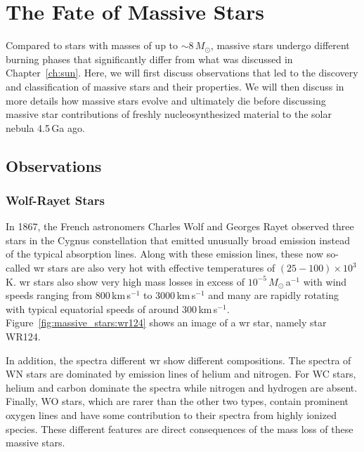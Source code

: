 
\chapter{The Fate of Massive Stars}

Compared to stars with masses of up to $\sim 8\,M_\odot$, massive stars undergo different burning phases that significantly differ from what was discussed in Chapter~\ref{ch:sun}. Here, we will first discuss observations that led to the discovery and classification of massive stars and their properties. We will then discuss in more details how massive stars evolve and ultimately die before discussing massive star contributions of freshly nucleosynthesized material to the solar nebula 4.5\,Ga ago.

\section{Observations}

\subsection{Wolf-Rayet Stars} In 1867, the French astronomers Charles Wolf and Georges Rayet observed three stars in the Cygnus constellation that emitted unusually broad emission instead of the typical absorption lines. Along with these emission lines, these now so-called \ac{wr} stars are also very hot with effective temperatures of $(25 - 100)\times 10^{3}$\,K. \ac{wr} stars also show very high mass losses in excess of $10^{-5}\,M_\odot$\,a$^{-1}$ with wind speeds ranging from 800\,km\,s$^{-1}$ to 3000\,km\,s$^{-1}$ and many are rapidly rotating with typical equatorial speeds of around 300\,km\,s$^{-1}$. Figure~\ref{fig:massive_stars:wr124} shows an image of a \ac{wr} star, namely star WR124. 

In addition, the spectra different \ac{wr} show different compositions. The spectra of WN stars are dominated by emission lines of helium and nitrogen. For WC stars, helium and carbon dominate the spectra while nitrogen and hydrogen are absent. Finally, WO stars, which are rarer than the other two types, contain prominent oxygen lines and have some contribution to their spectra from highly ionized species. These different features are direct consequences of the mass loss of these massive stars.


